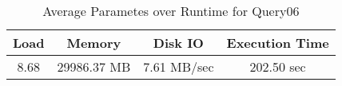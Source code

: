 \documentclass[../../main.tex]{subfiles}
\begin{document}
    \begin{table}
        \begin{center}
            \begin{tabular}{ |c|c|c|c| } 
            \hline
            Load & Memory & Disk IO & Execution Time\\
            \hline
            8.68 & 29986.37 MB & 7.61 MB/sec & 202.50 sec \\
            \hline
            \end{tabular}
            \\[1pt]
            \caption{Average Parametes over Runtime for Query06}
        \end{center}
    \end{table}
    \pagebreak
\end{document}
